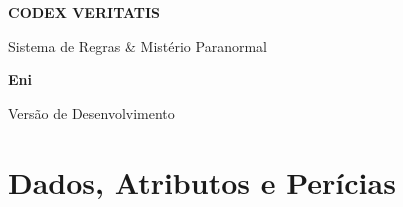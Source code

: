\documentclass[a4paper,11pt,openany]{book}
\begin{document}
\frontmatter

\begin{titlepage}
    \centering
    \vspace*{4cm}
    {\sffamily\Huge\bfseries\color{CodexRed} CODEX VERITATIS\par}
    \vspace{1cm}
    {\Large Sistema de Regras \& Mistério Paranormal\par}
    \vspace{8cm}
    {\Large\textbf{Eni}\par}
    \vfill
    {\small Versão de Desenvolvimento\par}
\end{titlepage}

\tableofcontents

\mainmatter


\chapter{Dados, Atributos e Perícias}
\end{document}
